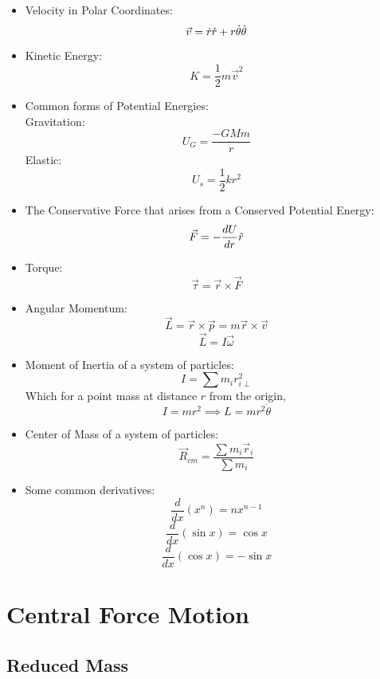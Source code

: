 \documentclass[11pt]{article}
\theoremstyle{gangnamstyle}{\newtheorem{definition}{Definition}[]}
\theoremstyle{gangnamstyle}{\newtheorem{example}{Example}[]}
\theoremstyle{gangnamstyle}{\newtheorem{problem}{Problem}[]}
\theoremstyle{gangnamstyle}{\newtheorem{warning}{Warning}[]}
\begin{document}
\begin{itemize}
\item Velocity in Polar Coordinates:
\[ \Vec{v} = \Dot{r}\Hat{r} + r\Dot{\theta}\Hat{\theta} \]
\item Kinetic Energy:
\[ K = \frac{1}{2}m\Vec{v}^2 \]
\item Common forms of Potential Energies: \\
Gravitation: 
\[ U_G = \frac{-GMm}{r} \]
Elastic:
\[ U_s = \frac{1}{2}kr^2 \]
\item The Conservative Force that arises from a Conserved Potential Energy:
\[ \Vec{F} = -\frac{dU}{dr} \Hat{r} \]
\item Torque:
\[ \Vec{\tau} = \Vec{r} \times \Vec{F} \]
\item Angular Momentum: 
\[ \Vec{L} = \Vec{r}\times\Vec{p} = m\Vec{r}\times\Vec{v} \]
\[ \Vec{L} = I\Vec{\omega} \]
\item Moment of Inertia of a system of particles:
\[ I = \sum m_ir_{i \perp}^2 \]
Which for a point mass at distance $r$ from the origin, 
\[ I = mr^2 \implies L = mr^2\Dot{\theta} \]
\item Center of Mass of a system of particles: 
\[ \Vec{R}_{cm} = \frac{\sum m_i\Vec{r}_i}{\sum m_i} \]
\item Some common derivatives: 
\[ \frac{d}{dx}(x^n) = nx^{n - 1} \]
\[ \frac{d}{dx}(\sin x) = \cos x \]
\[ \frac{d}{dx}(\cos x) = -\sin x \]
\end{itemize}
\pagebreak


\section{Central Force Motion}
\subsection{Reduced Mass}
\end{document}
